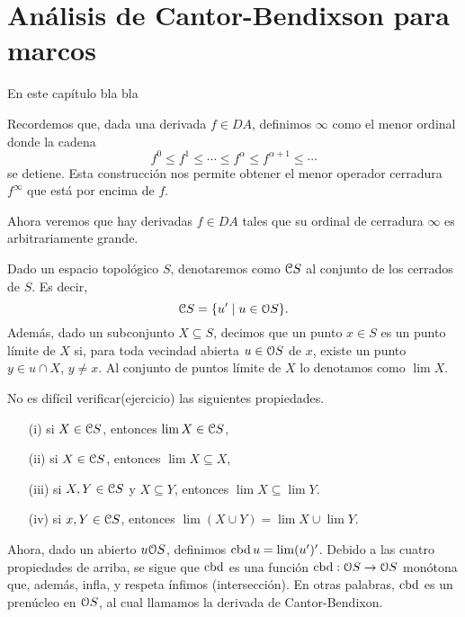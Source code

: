 \chapter{Análisis de Cantor-Bendixson para marcos}




En este capítulo bla bla 

















Recordemos que, dada una derivada $f\in DA$,
definimos $\infty$ como el menor ordinal donde la cadena
\[
    f^0\leq f^1\leq \cdots\leq f^\alpha \leq f^{\alpha+1} \leq \cdots
\]
se detiene.
Esta construcción nos permite obtener
el menor operador cerradura $f^\infty$
que está por encima de $f$.

Ahora veremos que hay derivadas $f\in DA$ tales que
su ordinal de cerradura $\infty$ es arbitrariamente grande.

Dado un espacio topológico $S$,
denotaremos como $\cal CS$ al conjunto de los cerrados de $S$.
Es decir,
\[
    \cal CS = \{u'\mid u\in\cal OS\}
.\]
Además, dado un subconjunto $X\subseteq S$,
decimos que un punto $x\in S$ es un punto límite de $X$ si,
para toda vecindad abierta $u\in\cal OS$ de $x$,
existe un punto $y\in u\cap X$, $y\neq x$.
Al conjunto de puntos límite de $X$ lo denotamos como $\lim X$.

No es difícil verificar(ejercicio) las siguientes propiedades.
\begin{itemize}
    \item[(i)] si $X\in\cal CS$, entonces $\lim X\in\cal CS$,
    \item[(ii)] si $X\in\cal CS$, entonces $\lim X\subseteq X$,
    \item[(iii)] si $X,Y\in\cal CS$ y $X\subseteq Y$,
        entonces $\lim X\subseteq\lim Y$.
    \item[(iv)] si $x,Y\in\cal CS$,
        entonces $\lim(X\cup Y)=\lim X\cup\lim Y$.
\end{itemize}

Ahora, dado un abierto $u\cal OS$, definimos $\cbd u = \lim(u')'$.
Debido a las cuatro propiedades de arriba,
se sigue que $\cbd$ es una función $\cbd:\cal OS\to\cal OS$
monótona que, además, infla, y respeta ínfimos (intersección).
En otras palabras, $\cbd$ es un prenúcleo en $\cal OS$,
al cual llamamos la derivada de Cantor-Bendixon.

